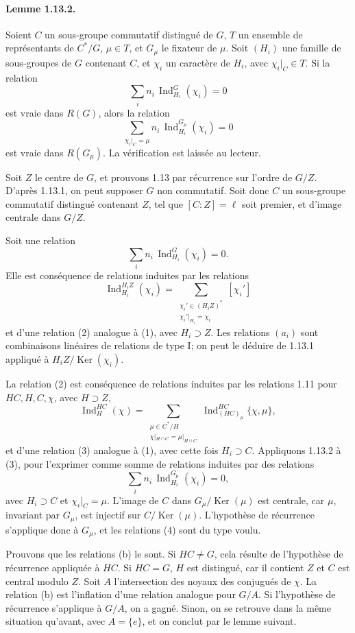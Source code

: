 \documentclass[10pt,letterpaper]{article}
\newcommand{\Ind}{\operatorname{Ind}}
\providecommand{\Ker}{\operatorname{Ker}}
\providecommand{\Ind}{\operatorname{Ind}}
\providecommand{\Ker}{\operatorname{Ker}}
\begin{document}
\paragraph{Lemme 1.13.2.} Soient \(C\) un sous-groupe commutatif distingué de \(G\), \(T\) un ensemble de représentants de \(C^*/G\), \(\mu\in T\), et \(G_\mu\) le fixateur de \(\mu\). Soit \((H_i)\) une famille de sous-groupes de \(G\) contenant \(C\), et \(\chi_i\) un caractère de \(H_i\), avec \(\chi_i|_C\in T\). Si la relation
\[
\sum_i n_i\,\Ind_{H_i}^G(\chi_i)=0
\]
est vraie dans \(R(G)\), alors la relation
\[
\sum_{\chi_i|_C=\mu}
n_i\,\Ind_{H_i}^{G_\mu}(\chi_i)=0
\]
est vraie dans \(R(G_\mu)\). La vérification est laissée au lecteur.

Soit \(Z\) le centre de \(G\), et prouvons 1.13 par récurrence sur l'ordre de \(G/Z\). D'après 1.13.1, on peut supposer \(G\) non commutatif. Soit donc \(C\) un sous-groupe commutatif distingué contenant \(Z\), tel que \([C:Z]=\ell\) soit premier, et d'image centrale dans \(G/Z\).

Soit une relation
\[
\tag{1}
\sum_i n_i\,\Ind_{H_i}^G(\chi_i)=0.
\]
Elle est conséquence de relations induites par les relations
\[
\tag{$a_i$}
\Ind_{H_i}^{H_iZ}(\chi_i)=
\sum_{\substack{\chi_i'\in(H_iZ)^*\\ \chi_i'|_{H_i}=\chi_i}}[\chi_i']
\]
et d'une relation (2) analogue à (1), avec \(H_i\supset Z\). Les relations \((a_i)\) sont combinaisons linéaires de relations de type I; on peut le déduire de 1.13.1 appliqué à \(H_iZ/\Ker(\chi_i)\).

La relation (2) est conséquence de relations induites par les relations 1.11 pour \(HC,H,C,\chi\), avec \(H\supset Z\),
\[
\tag{b}
\Ind_H^{HC}(\chi)=
\sum_{\substack{\mu\in C^*/H\\ \chi|_{H\cap C}=\mu|_{H\cap C}}}
\Ind_{(HC)_\mu}^{HC}\{\chi,\mu\},
\]
et d'une relation (3) analogue à (1), avec cette fois \(H_i\supset C\). Appliquons 1.13.2 à (3), pour l'exprimer comme somme de relations induites par des relations
\[
\tag{4}
\sum_i n_i\,\Ind_{H_i}^{G_\mu}(\chi_i)=0,
\]
avec \(H_i\supset C\) et \(\chi_i|_C=\mu\). L'image de \(C\) dans \(G_\mu/\Ker(\mu)\) est centrale, car \(\mu\), invariant par \(G_\mu\), est injectif sur \(C/\Ker(\mu)\). L'hypothèse de récurrence s'applique donc à \(G_\mu\), et les relations (4) sont du type voulu.

Prouvons que les relations (b) le sont. Si \(HC\ne G\), cela résulte de l'hypothèse de récurrence appliquée à \(HC\). Si \(HC=G\), \(H\) est distingué, car il contient \(Z\) et \(C\) est central modulo \(Z\). Soit \(A\) l'intersection des noyaux des conjugués de \(\chi\). La relation (b) est l'inflation d'une relation analogue pour \(G/A\). Si l'hypothèse de récurrence s'applique à \(G/A\), on a gagné. Sinon, on se retrouve dans la même situation qu'avant, avec \(A=\{e\}\), et on conclut par le lemme suivant.
\end{document}
